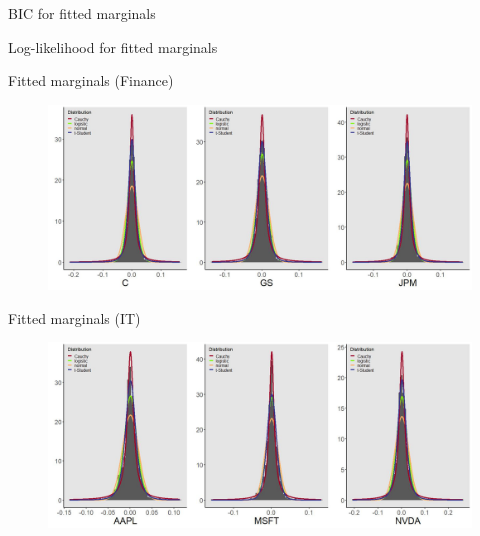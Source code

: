 \documentclass{beamer}
\begin{document}
\begin{frame}{BIC for fitted marginals}

\centering
\begin{table}
   
\end{table}

\end{frame}

\begin{frame}{Log-likelihood for fitted marginals}

\centering
\begin{table}
   
\end{table}

\end{frame}

\begin{frame}{Fitted marginals (Finance)}

\centering
\begin{figure}[!h]
  \centering
    \includegraphics[width=1\textwidth]{figures/marginals/financials_comapnies.jpeg}
\end{figure}
    
\end{frame}

\begin{frame}{Fitted marginals (IT)}

\centering
\begin{figure}[!h]
  \centering
    \includegraphics[width=1\textwidth]{figures/marginals/IT_comapnies.jpeg}
\end{figure}
    
\end{frame}
\end{document}
